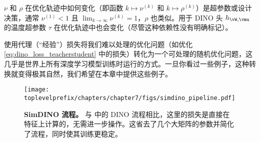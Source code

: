 \documentclass[../../book-main.tex]{subfiles}
\begin{document}
\(\nu\) 和 \(\rho\) 在优化轨迹中如何变化（即函数 \(k \mapsto \nu^{(k)}\) 和 \(k \mapsto \rho^{(k)}\)）是超参数或设计决策，通常 \(\nu^{(1)} < 1\) 且 \(\lim_{k \to \infty}\nu^{(k)} = 1\)，\(\rho\) 也类似。用于 DINO 头 \(h_{\vW, \vmu}\) 的温度超参数 \(\tau\) 在优化轨迹中也会变化（尽管这种依赖性没有明确标记）。

使用代理（“经验”）损失将我们难以处理的优化问题（如优化 \eqref{eq:dino_loss_teacherstudent} 中的损失）转化为一个可处理的随机优化问题，这几乎是世界上所有深度学习模型训练时运行的方式。一旦你看过一些例子，这种转换就变得极其自然，我们希望在本章中提供这些例子。

\begin{figure}
    \centering 
    \texttt{[image: \\toplevelprefix/chapters/chapter7/figs/simdino\_pipeline.pdf]}
    \caption{\small\textbf{SimDINO 流程。} 与  中的 DINO 流程相比，这里的损失是直接在特征上计算的，无需进一步操作。这省去了几个大矩阵的参数并简化了流程，同时使其训练更稳定。}\label{fig:simdino_pipeline}
\end{figure}
\end{document}
